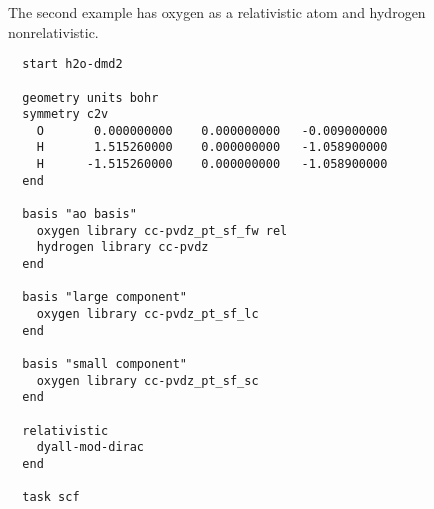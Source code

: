 The second example has oxygen as a relativistic atom and hydrogen nonrelativistic.

\begin{verbatim}
  start h2o-dmd2

  geometry units bohr
  symmetry c2v
    O       0.000000000    0.000000000   -0.009000000
    H       1.515260000    0.000000000   -1.058900000
    H      -1.515260000    0.000000000   -1.058900000
  end

  basis "ao basis"
    oxygen library cc-pvdz_pt_sf_fw rel
    hydrogen library cc-pvdz
  end

  basis "large component"
    oxygen library cc-pvdz_pt_sf_lc
  end

  basis "small component"
    oxygen library cc-pvdz_pt_sf_sc
  end

  relativistic
    dyall-mod-dirac
  end

  task scf
\end{verbatim}
